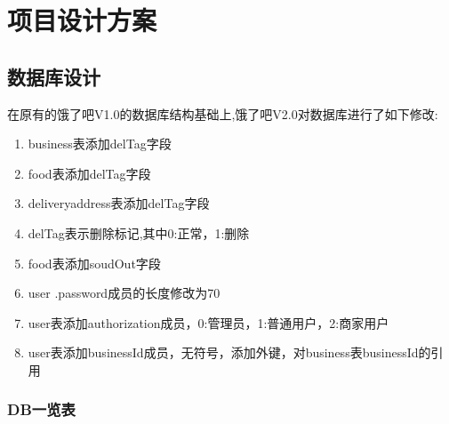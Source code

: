 \chapter{项目设计方案}

\section{数据库设计}
在原有的饿了吧V1.0的数据库结构基础上,饿了吧V2.0对数据库进行了如下修改:
  \begin{enumerate}
      \item business表添加delTag字段
      \item food表添加delTag字段
      \item deliveryaddress表添加delTag字段
      \item delTag表示删除标记,其中0:正常，1:删除
      \item food表添加soudOut字段
      \item user .password成员的长度修改为70
      \item user表添加authorization成员，0:管理员，1:普通用户，2:商家用户
        \item user表添加businessId成员，无符号，添加外键，对business表businessId的引用
  \end{enumerate}
\subsection{DB一览表}
\begin{table}[h]
\caption{数据库一览表}
\label{tab:dbyl}
\end{table}

